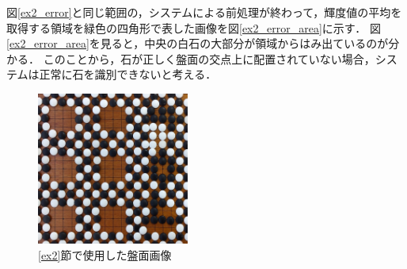 \documentclass[summary]{nitocs}
\numberwithin{equation}{section}
\begin{document}
            図\ref{ex2_error}と同じ範囲の，システムによる前処理が終わって，輝度値の平均を取得する領域を緑色の四角形で表した画像を図\ref{ex2_error_area}に示す．
            図\ref{ex2_error_area}を見ると，中央の白石の大部分が領域からはみ出ているのが分かる．
            このことから，石が正しく盤面の交点上に配置されていない場合，システムは正常に石を識別できないと考える．
            
            \begin{figure}[tb] %
                \begin{center}
                \includegraphics[clip,width=50mm]{DSC_0099/boardImg.jpg} 
                \caption{\ref{ex2}節で使用した盤面画像}
                \label{ex2_img}
                \end{center}
            \end{figure}
\end{document}
